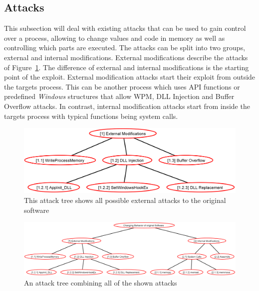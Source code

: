 \subsection{Attacks}
\label{sec:attacks}
This subsection will deal with existing attacks that can be used to gain control over a process, allowing to change values and code in memory as well as controlling which parts are executed. The attacks can be split into two groups, external and internal modifications. External modifications describe the attacks of Figure~\ref{fig:attacks_external}. The difference of external and internal modifications is the starting point of the exploit. External modification attacks start their exploit from outside the targets process. This can be another process which uses \gls{API} functions or predefined \emph{Windows} structures that allow \gls{WPM}, \gls{DLL} Injection and Buffer Overflow attacks. In contrast, internal modification attacks start from inside the targets process with typical functions being system calls.
\begin{figure}[h]
\centering
\includegraphics[width=\textwidth,keepaspectratio]{sections/adtrees/ExternalModificationsWithoutDefenses.png}
\caption{This attack tree shows all possible external attacks to the original software}
\label{fig:attacks_external}
\end{figure}






\begin{figure}[!p]
	\centering
	\includegraphics[angle=90,height=\textheight,keepaspectratio]{sections/adtrees/ProcessVirtualMemoryWithoutDefenses.png}
	\caption{An attack tree combining all of the shown attacks}
	\label{fig:attacks}
\end{figure}
